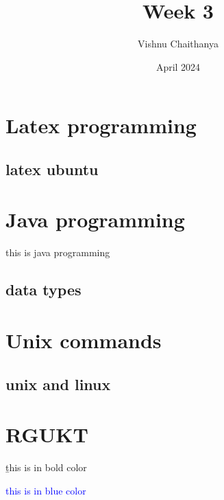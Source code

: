\documentclass{article}
\title{Week 3}
\author{Vishnu Chaithanya}
\date{April 2024}
\begin{document}
	
	\maketitle
	
	\tableofcontents
	\newpage
	
	\section{Latex programming} \label{sec:intro}
	\subsection{latex ubuntu}
	
	\section{Java programming} \label{sec:java}
	this is java programming
	\subsection{data types}
	
	\section{Unix commands} \label{sec:intro}
	\subsection{unix and linux}
	
	
	\section{RGUKT}
	\b{this is in bold color}
	
	\textcolor{blue}{this is in blue color}
	
	
\end{document}
